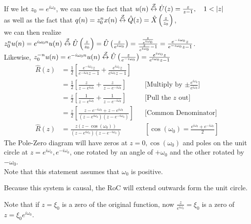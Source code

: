 If we let $z_0=e^{i\omega_0}$, we can use the fact that $u(n)\zt \hat U(z)=\frac{z}{z-1},\quad1<|z|$\\
as well as the fact that $q(n)=z_{0}^{n} x(n)\stackrel{\mathcal{Z}}{\leftrightarrow} \hat Q(z)=\hat{X}\left(\frac{z}{z_0}\right)$,\\
we can then realize $z_0^n u(n)
=e^{i\omega_0n}u(n)
\stackrel{\mathcal{Z}}{\leftrightarrow}
\hat U\left({\frac{z}{z_0}}\right)
=\hat U\left({\frac{z}{e^{i\omega_0}}}\right)
=\frac{\frac{z}{e^{i\omega_0}}}{\frac{z}{e^{i\omega_0}}-1}
=\frac{{e^{-i\omega_0}{z}}}{{e^{-i\omega_0}{z}}-1}$.\\
Likewise, $z_0^{-n} u(n)
=e^{-i\omega_0n}u(n)
\stackrel{\mathcal{Z}}{\leftrightarrow}
\hat U\left({\frac{z}{e^{-i\omega_0}}}\right)
=\frac{{e^{i\omega_0}{z}}}{{e^{i\omega_0}{z}}-1}$
\begin{align*}
    \hat R(z) 
    &=
    \frac12
    \left[
        \frac{{e^{-i\omega_0}{z}}}{{e^{-i\omega_0}{z}}-1}
        +
        \frac{{e^{i\omega_0}{z}}}{{e^{i\omega_0}{z}}-1}
    \right]
    \\
    &=
    \frac12
    \left[
        \frac{{{z}}}{{{z}}-e^{i\omega_0}}
        +
        \frac{{{z}}}{{{z}}-e^{-i\omega_0}}
    \right]
    &&\text{[Multiply by $\pm\frac{e^{i\omega_0}}{e^{i\omega_0}}$]}
    \\
    &=
    \frac{z}2
    \left[
        \frac{1}{{{z}}-e^{i\omega_0}}
        +
        \frac{1}{{{z}}-e^{-i\omega_0}}
    \right]
    &&\text{[Pull the $z$ out]}
    \\
    &=
    \frac{z}2
    \left[
        \frac{z-e^{-i\omega_0} + z-e^{i\omega_0}}{(z-e^{i\omega_0})(z-e^{-i\omega_0})}
    \right]
    &&\text{[Common Denominator]}
    \\
    \hat R(z) 
    &=
    \frac{z(z-\cos(\omega_0))}{(z-e^{i\omega_0})(z-e^{-i\omega_0})}
    &&\left[\cos(\omega_0)=\frac{e^{i\omega_0}+e^{-i\omega_0}}{2}\right]
\end{align*}
The Pole-Zero diagram will have zeros at $z=0, \cos(\omega_0)$ and poles on the unit circle at $z=e^{i\omega_0}, e^{-i\omega_0}$, one rotated by an angle of $+\omega_0$ and the other rotated by $-\omega_0$.\\
Note that this statement assumes that $\omega_0$ is positive.

Because this system is causal, the RoC will extend outwards form the unit circle.

\begin{shaded}
Note that if $z=\xi_0$ is a zero of the original function, now $\frac{z}{e^{i\omega_0}}=\xi_0$ is a zero of $z=\xi_0e^{i\omega_0}$.
\end{shaded}

